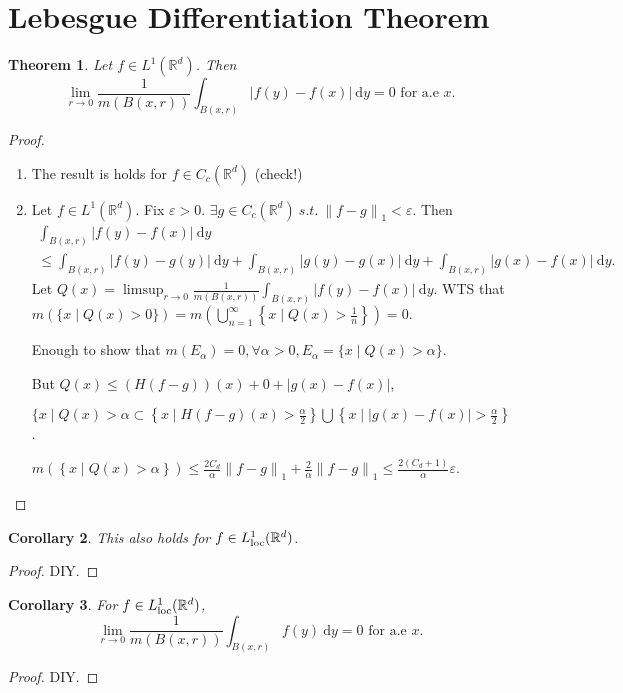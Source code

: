 \documentclass{report}
\newcommand{\R}{\mathbb{R}}
\newcommand{\st}{\ s.t.\ }
\newcommand{\df}{\ \mathrm{d}}
\newcommand{\norm}[1]{\left\| #1 \right\|}
\newtheorem{theorem}{Theorem}[chapter]
\newtheorem{corollary}[theorem]{Corollary}
\theoremstyle{definition}
\theoremstyle{remark}
\begin{document}
\section{Lebesgue Differentiation Theorem}
\begin{theorem}
	Let $f \in L^1(\R^d)$. Then \[\displaystyle \lim_{r \to 0} \frac{1}{m(B(x, r))} \int_{B(x, r)} |f(y) - f(x)| \df y = 0 \text{ for a.e } x.\]
\end{theorem}
\begin{proof}
	\begin{enumerate}
		\item The result is holds for $f \in C_c(\R^d)$ (check!)
		\item Let $f \in L^1(\R^d)$. Fix $\varepsilon > 0$. $\exists g \in C_c(\R^d) \st \norm{f - g}_1 < \varepsilon$. Then \begin{multline*}
			\int_{B(x, r)} |f(y) - f(x)| \df y \\
			\leq \int_{B(x, r)}|f(y) - g(y)| \df y + \int_{B(x, r)}|g(y) - g(x)| \df y + \int_{B(x, r)}|g(x) - f(x)| \df y.
		\end{multline*}
		Let $Q(x) = \limsup_{r \to 0}\frac{1}{m(B(x,r))}\int_{B(x, r)}|f(y) - f(x)| \df y$. WTS that $m\left(\{x \mid Q(x) > 0\}\right) = m \left(\bigcup_{n=1}^\infty\left\lbrace x \mid Q(x) > \frac{1}{n}\right\rbrace\right) = 0.$

		Enough to show that $m(E_\alpha) = 0, \forall \alpha > 0, E_\alpha = \{x \mid Q(x) > \alpha\}$.

		But $Q(x) \leq (H(f - g))(x) + 0 + |g(x) - f(x)|$, 
		
		$\{x \mid Q(x) > \alpha \subset \left\lbrace x \mid H(f - g)(x) > \frac{\alpha}{2}\right\rbrace \bigcup \left\lbrace x \mid |g(x) - f(x)| > \frac{\alpha}{2}\right\rbrace$.

		$m\left(\left\lbrace x \mid Q(x) > \alpha \right\rbrace\right) \leq \frac{2C_d}{\alpha} \norm{f - g}_1 + \frac{2}{\alpha}\norm{f - g}_1 \leq \frac{2(C_d + 1)}{\alpha}\varepsilon$. \qedhere
	\end{enumerate}
\end{proof}

\begin{corollary}
	This also holds for $f \in L^1_{\textup{loc}}(\R^d)$.
\end{corollary}
\begin{proof}
	DIY.
\end{proof}
\begin{corollary}
	For $f \in L^1_{\textup{loc}}(\R^d)$, 
	\[
		\lim_{r \to 0} \frac{1}{m(B(x, r))} \int_{B(x, r)} f(y) \df y = 0 \text{ for a.e }x.
	\]
\end{corollary}
\begin{proof}
	DIY.
\end{proof}
\end{document}
